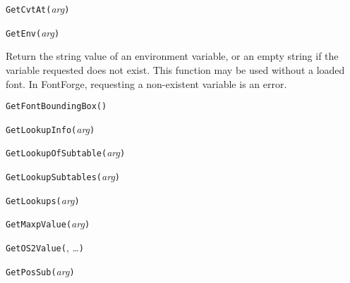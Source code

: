 

\texttt{GetCvtAt(}\textit{arg}\texttt{)}



\texttt{GetEnv(}\textit{arg}\texttt{)}

Return the string value of an environment variable, or an empty string if
the variable requested does not exist.
This function may be used without a loaded font.
In \FFdiff FontForge, requesting a non-existent variable is an error.



\texttt{GetFontBoundingBox(}\texttt{)}



\texttt{GetLookupInfo(}\textit{arg}\texttt{)}



\texttt{GetLookupOfSubtable(}\textit{arg}\texttt{)}



\texttt{GetLookupSubtables(}\textit{arg}\texttt{)}



\texttt{GetLookups(}\textit{arg}\texttt{)}



\texttt{GetMaxpValue(}\textit{arg}\texttt{)}



\texttt{GetOS2Value(}, \ldots\texttt{)}



\texttt{GetPosSub(}\textit{arg}\texttt{)}


